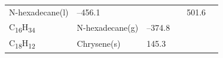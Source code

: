 \documentclass[
  9pt,
]{extbook}
\theoremstyle{definition}
\theoremstyle{definition}
\theoremstyle{definition}
\theoremstyle{remark}
\begin{document}
\begin{longtable}[]{@{}llllll@{}}
\begin{minipage}[t]{0.17\columnwidth}
N-hexadecane(l)\strut
\end{minipage} & \begin{minipage}[t]{0.15\columnwidth}\raggedright
--456.1\strut
\end{minipage} & \begin{minipage}[t]{0.15\columnwidth}\raggedright
\strut
\end{minipage} & \begin{minipage}[t]{0.14\columnwidth}\raggedright
\strut
\end{minipage} & \begin{minipage}[t]{0.14\columnwidth}\raggedright
501.6\strut
\end{minipage}\tabularnewline
\begin{minipage}[t]{0.07\columnwidth}\raggedright
C\textsubscript{16}H\textsubscript{34}\strut
\end{minipage} & \begin{minipage}[t]{0.17\columnwidth}\raggedright
N-hexadecane(g)\strut
\end{minipage} & \begin{minipage}[t]{0.15\columnwidth}\raggedright
--374.8\strut
\end{minipage} & \begin{minipage}[t]{0.15\columnwidth}\raggedright
\strut
\end{minipage} & \begin{minipage}[t]{0.14\columnwidth}\raggedright
\strut
\end{minipage} & \begin{minipage}[t]{0.14\columnwidth}\raggedright
\strut
\end{minipage}\tabularnewline
\begin{minipage}[t]{0.07\columnwidth}\raggedright
C\textsubscript{18}H\textsubscript{12}\strut
\end{minipage} & \begin{minipage}[t]{0.17\columnwidth}\raggedright
Chrysene(s)\strut
\end{minipage} & \begin{minipage}[t]{0.15\columnwidth}\raggedright
145.3\strut
\end{minipage} & \begin{minipage}[t]{0.15\columnwidth}\raggedright
\strut
\end{minipage} & \begin{minipage}[t]{0.14\columnwidth}\raggedright
\strut
\end{minipage} & \begin{minipage}[t]{0.14\columnwidth}\raggedright

\end{minipage}
\end{longtable}
\end{document}
